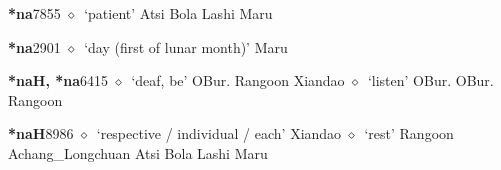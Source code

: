   \begin{list}{}{\leftmargin=1.5em \itemindent=-1.5em}
  \item {\footnotesize \textbf{*na}}{\tiny 7855}
         $\diamond$~`patient'
         Atsi 
\hspace{1ex}
         Bola 
\hspace{1ex}
         Lashi 
\hspace{1ex}
         Maru 
  \item {\footnotesize \textbf{*na}}{\tiny 2901}
\hspace{1ex}
         $\diamond$~`day (first of lunar month)'
         Maru 
  \item {\footnotesize \textbf{*naH, *na}}{\tiny 6415}
\hspace{1ex}
         $\diamond$~`deaf, be'
         OBur. 
\hspace{1ex}
         Rangoon 
\hspace{1ex}
         Xiandao 
\hspace{1ex}
         $\diamond$~`listen'
         OBur. 
\hspace{1ex}
         OBur. 
\hspace{1ex}
         Rangoon 
  \item {\footnotesize \textbf{*naH}}{\tiny 8986}
\hspace{1ex}
         $\diamond$~`respective / individual / each'
         Xiandao 
\hspace{1ex}
         $\diamond$~`rest'
         Rangoon 
\hspace{1ex}
         Achang\_Longchuan 
\hspace{1ex}
         Atsi 
\hspace{1ex}
         Bola 
\hspace{1ex}
         Lashi 
\hspace{1ex}
         Maru 
\hspace{1ex}

\end{list}
